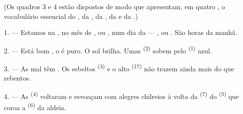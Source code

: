 %
%

\VUsaut{3.0mm}
\VUsaut{1.6mm}
\VUsaut{3.4mm}

(Os quadros 3 e 4 estão dispostos de modo que apresentam, em quatro
, o vocabulário essencial do , da
, da , da  e da .)
\VUsaut{4.0mm}

\VUsaut{3.0mm}

\VUsaut{2.4mm}

\VUsaut{3.0mm}

1. --- Estamos na , no mês de ,
 ou , num dia da  ---
,  ou . São
 horas da manhã.

2. --- Está bom , o  é puro. O sol brilha. Umas
 \textsuperscript{(2)} sobem pelo 
\textsuperscript{(1)} azul.

3. --- As  mal têm . Os esbeltos
 \textsuperscript{(3)} e o alto  \textsuperscript{(17)}
não trazem ainda mais do que rebentos.

4. --- As  \textsuperscript{(4)} voltaram e esvoaçam com
alegres chilreios à volta da  \textsuperscript{(7)} do
 \textsuperscript{(5)} que coroa a 
\textsuperscript{(6)} da aldeia.

\VUsaut{3.4mm}
\VUsaut{3.0mm}


